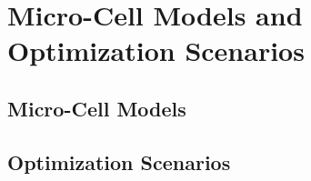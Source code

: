 \section{Micro-Cell Models and Optimization Scenarios}
\label{sec:63models}

\dummytext[5]{}

\subsection{Micro-Cell Models}
\label{sec:631models}

\dummytext[5]{}

\subsection{Optimization Scenarios}
\label{sec:632scenarios}

\dummytext[5]{}
